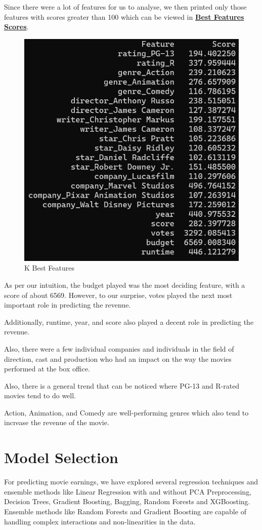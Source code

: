 \documentclass[conference]{IEEEtran}
\begin{document}
            Since there were a lot of features for us to analyse, we then printed only those features with scores greater than 100 which can be viewed in \href{https://github.com/Vikranth3140/Movie-Revenue-Prediction/blob/main/Helper%20files/Best%20Festures/significant_features.txt}{\textbf{Best Features Scores}}.
            
            \begin{figure}
                \centering
                \includegraphics[width=0.5\linewidth]{k-best.png}
                \caption{K Best Features}
                \label{fig:k-best}
            \end{figure}
            
            As per our intuition, the budget played was the most deciding feature, with a score of about 6569.
            However, to our surprise, votes played the next most important role in predicting the revenue.
            
            Additionally, runtime, year, and score also played a decent role in predicting the revenue.
            
            Also, there were a few individual companies and individuals in the field of direction, cast and production who had an impact on the way the movies performed at the box office.
            
            Also, there is a general trend that can be noticed where PG-13 and R-rated movies tend to do well.
            
            Action, Animation, and Comedy are well-performing genres which also tend to increase the revenue of the movie.

\section{Model Selection}
    For predicting movie earnings, we have explored several regression techniques and ensemble methods like Linear Regression with and without PCA Preprocessing, Decision Trees, Gradient Boosting, Bagging, Random Forests and XGBoosting.
    Ensemble methods like Random Forests and Gradient Boosting are capable of handling complex interactions and non-linearities in the data.
    
\end{document}
